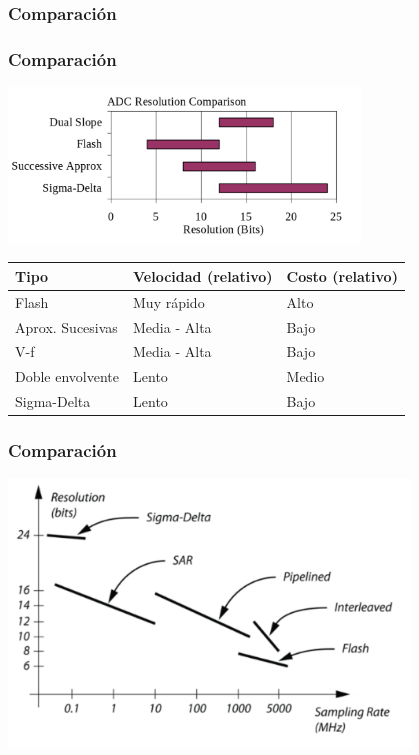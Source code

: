\documentclass{beamer}
\begin{document}
\subsubsection{Comparación}

\begin{frame}
\frametitle{Comparación}
\begin{center}
\includegraphics[width=0.7\textwidth]{d3/adc_types_comparison}
\end{center}
\begin{table}[bt]
\begin{tabular}{|l|l|l|} \hline
\textbf{Tipo}    & \bf{Velocidad (relativo)} & \bf{Costo (relativo)} \\ \hline
 Flash            & Muy rápido                 & Alto  \\
 Aprox. Sucesivas & Media - Alta	              & Bajo  \\
 V-f              & Media - Alta	              & Bajo  \\
Doble envolvente & Lento                      & Medio \\
Sigma-Delta      & Lento                      &	Bajo  \\ \hline
\end{tabular}
\end{table}
\end{frame}

\begin{frame}
\frametitle{Comparación}
\begin{center}
\includegraphics[width=0.8\textwidth]{d3/comparacion_adc_res_vs_frec}
\end{center}
\end{frame}
\end{document}
